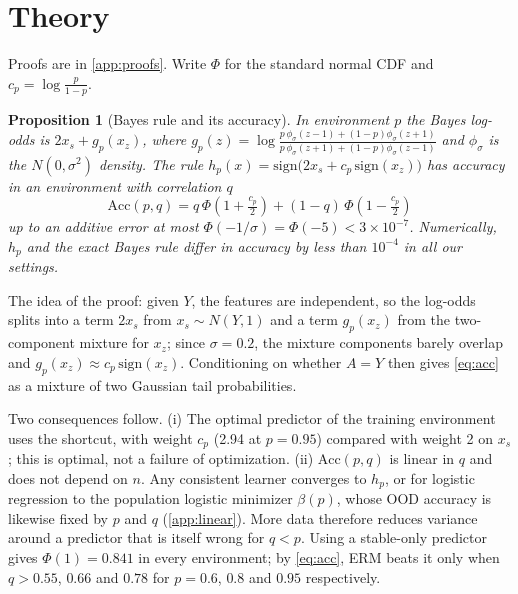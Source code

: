 \documentclass{article}
\newtheorem{proposition}{Proposition}
\newcommand{\Acc}{\mathrm{Acc}}
\newcommand{\sign}{\mathrm{sign}}
\begin{document}
\section{Theory}
\label{sec:theory}

Proofs are in \cref{app:proofs}. Write $\Phi$ for the standard normal CDF and
$c_p=\log\frac{p}{1-p}$.

\begin{proposition}[Bayes rule and its accuracy]
\label{prop:bayes}
In environment $p$ the Bayes log-odds is $2x_s + g_p(x_z)$, where
$g_p(z)=\log\frac{p\,\phi_\sigma(z-1)+(1-p)\phi_\sigma(z+1)}{p\,\phi_\sigma(z+1)+(1-p)\phi_\sigma(z-1)}$
and $\phi_\sigma$ is the $N(0,\sigma^2)$ density. The rule $h_p(x)=\sign\big(2x_s+c_p\,\sign(x_z)\big)$
has accuracy in an environment with correlation $q$
\begin{equation}
  \Acc(p,q) = q\,\Phi\!\left(1+\tfrac{c_p}{2}\right) + (1-q)\,\Phi\!\left(1-\tfrac{c_p}{2}\right)
  \label{eq:acc}
\end{equation}
up to an additive error at most $\Phi(-1/\sigma)=\Phi(-5)<3\times10^{-7}$. Numerically, $h_p$ and the
exact Bayes rule differ in accuracy by less than $10^{-4}$ in all our settings.
\end{proposition}

The idea of the proof: given $Y$, the features are independent, so the log-odds splits into a term $2x_s$ from $x_s\sim N(Y,1)$ and a term $g_p(x_z)$ from the two-component mixture for $x_z$; since $\sigma=0.2$, the mixture components barely overlap and $g_p(x_z)\approx c_p\,\sign(x_z)$. Conditioning on whether $A=Y$ then gives \eqref{eq:acc} as a mixture of two Gaussian tail probabilities.

Two consequences follow. (i) The optimal predictor of the training environment uses the shortcut,
with weight $c_p$ (2.94 at $p=0.95$) compared with weight 2 on $x_s$; this is optimal, not a failure
of optimization. (ii) $\Acc(p,q)$ is linear in $q$ and does not depend on $n$. Any consistent
learner converges to $h_p$, or for logistic regression to the population logistic minimizer
$\beta(p)$, whose OOD accuracy is likewise fixed by $p$ and $q$ (\cref{app:linear}). More data
therefore reduces variance around a predictor that is itself wrong for $q<p$. Using a stable-only
predictor gives $\Phi(1)=0.841$ in every environment; by \eqref{eq:acc}, ERM beats it only when
$q > 0.55$, $0.66$ and $0.78$ for $p=0.6$, $0.8$ and $0.95$ respectively.
\end{document}
